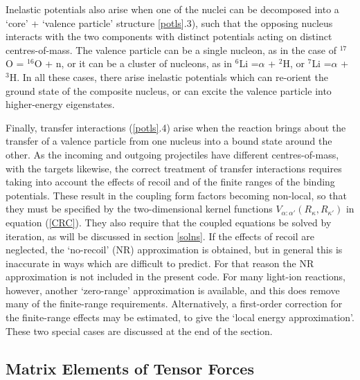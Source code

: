\documentclass[11pt,a4paper]{article}
\newcommand{\Vee}{{\sf V}}
\begin{document}
Inelastic potentials also arise when one of the
nuclei can be decomposed into a `core' + `valence particle'
structure \ref{potls}.3),
such that the opposing nucleus interacts with the two
components with distinct potentials acting on distinct centres-of-mass.
The valence particle can be a single nucleon, as in the case of
$^{17}$O = $^{16}$O + n, or it can be a cluster of nucleons,
as in $^6$Li =$\alpha$ + $^2$H, or
$^7$Li =$\alpha$ + $^3$H.  In all these cases, there arise
inelastic potentials which can re-orient the ground state of the
composite nucleus, or can excite the valence particle into higher-energy
eigenstates.

Finally, transfer interactions (\ref{potls}.4) arise when the
reaction brings about the transfer of a valence particle from one nucleus
into a bound state around the other. As the incoming and outgoing
projectiles have different centres-of-mass, with the targets likewise,
the correct treatment of transfer interactions requires taking into
account the effects of recoil and of the finite ranges of the binding
potentials. These result in the coupling form factors becoming non-local,
so that they must be specified by the two-dimensional kernel functions
$ V_{\alpha :\alpha'} (R_\kappa , R_{\kappa'} )$
in equation (\ref{CRC}). They also require that the coupled equations be solved
by iteration, as will be discussed in section \ref{solns}.
If the effects of recoil are neglected, the `no-recoil' (NR)
approximation is obtained, but in general\cite{LOLA}
this is inaccurate in ways which are difficult to predict. For that reason
the NR approximation is not included in the present code.
For many light-ion reactions, however, another `zero-range'
approximation is available, and this does remove many of the finite-range
requirements. Alternatively, a first-order correction for the finite-range
effects may be estimated, to give the `local energy approximation'.
These two special cases are discussed at the end of the section.
\subsection{Matrix Elements of Tensor Forces}

\newcommand{\Jp}{J_p}
\newcommand{\Jt}{J_t}
\newcommand{\JT}{J_T}
\newcommand{\Jpq}{\ensuremath{J'_p}}
\newcommand{\Jtq}{\ensuremath{J'_t}}
\newcommand{\Lq}{L'}
\newcommand{\Sq}{\ensuremath{S'}}
\end{document}
